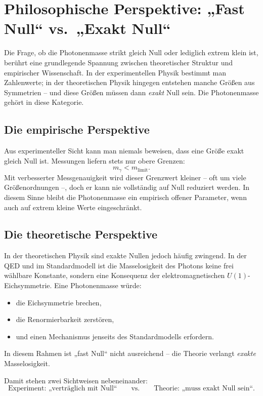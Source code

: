 \section{Philosophische Perspektive: „Fast Null“ vs.\ „Exakt Null“}

Die Frage, ob die Photonenmasse strikt gleich Null oder lediglich extrem 
klein ist, berührt eine grundlegende Spannung zwischen theoretischer 
Struktur und empirischer Wissenschaft. In der experimentellen Physik 
bestimmt man Zahlenwerte; in der theoretischen Physik hingegen entstehen 
manche Größen aus Symmetrien – und diese Größen müssen dann \emph{exakt} 
Null sein. Die Photonenmasse gehört in diese Kategorie.

\subsection*{Die empirische Perspektive}

Aus experimenteller Sicht kann man niemals beweisen, dass eine Größe exakt 
gleich Null ist. Messungen liefern stets nur obere Grenzen:
\[
m_\gamma < m_{\mathrm{limit}}.
\]
Mit verbesserter Messgenauigkeit wird dieser Grenzwert kleiner – oft um 
viele Größenordnungen –, doch er kann nie vollständig auf Null reduziert 
werden. In diesem Sinne bleibt die Photonenmasse ein empirisch offener 
Parameter, wenn auch auf extrem kleine Werte eingeschränkt.

\subsection*{Die theoretische Perspektive}

In der theoretischen Physik sind exakte Nullen jedoch häufig zwingend.  
In der QED und im Standardmodell ist die Masselosigkeit des Photons keine 
frei wählbare Konstante, sondern eine Konsequenz der 
elektromagnetischen $U(1)$-Eichsymmetrie.  
Eine Photonenmasse würde:

\begin{itemize}
	\item die Eichsymmetrie brechen,
	\item die Renormierbarkeit zerstören,
	\item und einen Mechanismus jenseits des Standardmodells erfordern.
\end{itemize}

In diesem Rahmen ist „fast Null“ nicht ausreichend – die Theorie verlangt 
\emph{exakte} Masselosigkeit.

Damit stehen zwei Sichtweisen nebeneinander:
\[
\text{Experiment: „verträglich mit Null“}
\qquad\text{vs.}\qquad
\text{Theorie: „muss exakt Null sein“}.
\]

